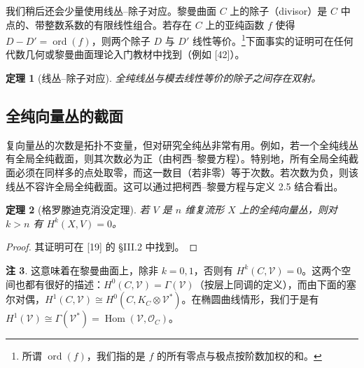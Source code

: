 \documentclass[11pt,a4paper]{article}
\theoremstyle{plain}
\newtheorem{theorem}{定理}[section]
\theoremstyle{definition}
\newtheorem{remark}[theorem]{注}
\begin{document}

我们稍后还会少量使用线丛–除子对应。黎曼曲面 $C$ 上的除子（divisor）是 $C$ 中点的、带整数系数的有限线性组合。若存在 $C$ 上的亚纯函数 $f$ 使得 $D-D'=\operatorname{ord}(f)$，则两个除子 $D$ 与 $D'$ 线性等价。\footnote{所谓 $\operatorname{ord}(f)$，我们指的是 $f$ 的所有零点与极点按阶数加权的和。}下面事实的证明可在任何代数几何或黎曼曲面理论入门教材中找到（例如 [42]）。


\begin{theorem}[线丛–除子对应]
全纯线丛与模去线性等价的除子之间存在双射。
\end{theorem}

\subsection{全纯向量丛的截面}

复向量丛的次数是拓扑不变量，但对研究全纯丛非常有用。例如，若一个全纯线丛有全局全纯截面，则其次数必为正（由柯西–黎曼方程）。特别地，所有全局全纯截面必须在同样多的点处取零，而这一数目（若非零）等于次数。若次数为负，则该线丛不容许全局全纯截面。这可以通过把柯西–黎曼方程与定义 2.5 结合看出。

\begin{theorem}[格罗滕迪克消没定理]
若 $V$ 是 $n$ 维复流形 $X$ 上的全纯向量丛，则对 $k>n$ 有 $H^k(X,V)=0$。
\end{theorem}
\begin{proof}
其证明可在 [19] 的 §III.2 中找到。
\end{proof}

\begin{remark}
这意味着在黎曼曲面上，除非 $k=0,1$，否则有 $H^k(C,\mathcal{V})=0$。这两个空间也都有很好的描述：$H^0(C,\mathcal{V})=\Gamma(\mathcal{V})$（按层上同调的定义），而由下面的塞尔对偶，$H^1(C,\mathcal{V})\cong H^0(C,K_C\otimes\mathcal{V}^*)$。在椭圆曲线情形，我们于是有 $H^1(\mathcal{V})\cong\Gamma(\mathcal{V}^*)=\operatorname{Hom}(\mathcal{V},\mathcal{O}_C)$。
\end{remark}
\end{document}

